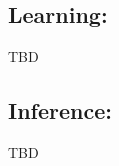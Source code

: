 \documentclass[a4paper,11pt]{report}
\begin{document}
{    \subsection{Learning:}
      \label{subseq:PGMs/MM/Learning}
      TBD

    \subsection{Inference:}
      \label{subseq:PGMs/MM/Inference}
      TBD
      
% 	
% 
% 
%       
%   
%     

		
}
\end{document}
